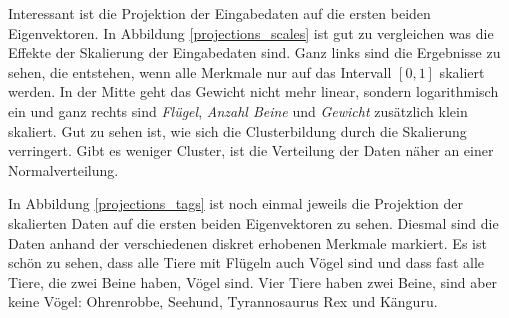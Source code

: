  Interessant ist die Projektion der Eingabedaten auf die ersten beiden Eigenvektoren. In Abbildung \ref{projections_scales} ist gut zu vergleichen was die Effekte der Skalierung der Eingabedaten sind. Ganz links sind die Ergebnisse zu sehen, die entstehen, wenn alle Merkmale nur auf das Intervall $[0, 1]$ skaliert werden. In der Mitte geht das Gewicht nicht mehr linear, sondern logarithmisch ein und ganz rechts sind \emph{Flügel}, \emph{Anzahl Beine} und \emph{Gewicht} zusätzlich klein skaliert. Gut zu sehen ist, wie sich die Clusterbildung durch die Skalierung verringert. Gibt es weniger Cluster, ist die Verteilung der Daten näher an einer Normalverteilung.
 
 In Abbildung \ref{projections_tags} ist noch einmal jeweils die Projektion der skalierten Daten auf die ersten beiden Eigenvektoren zu sehen. Diesmal sind die Daten anhand der verschiedenen diskret erhobenen Merkmale markiert. Es ist \zb schön zu sehen, dass alle Tiere mit Flügeln auch Vögel sind und dass fast alle Tiere, die zwei Beine haben, Vögel sind. Vier Tiere haben zwei Beine, sind aber keine Vögel: Ohrenrobbe, Seehund, Tyrannosaurus Rex und Känguru.

